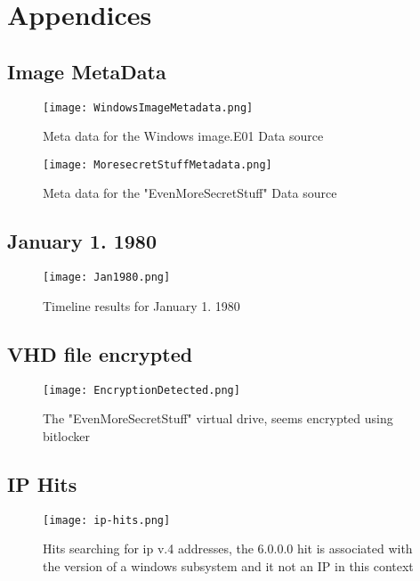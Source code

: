 \documentclass[
	letterpaper, %
	10pt, %
	unnumberedsections, %
	twoside, %
]{APAAssignment}
\begin{document}
\chapter{Appendices}
\begin{appendices}

	\section{Image MetaData}\label{app:MetaData}


	\begin{figure}[!h] %
		\centering
		\texttt{[image: WindowsImageMetadata.png]}
		\caption{Meta data for the Windows image.E01 Data source}
		\label{fig:windowsIageMetadata}
	\end{figure}


	\begin{figure}[!h] %
		\centering
		\texttt{[image: MoresecretStuffMetadata.png]}
		\caption{Meta data for the "EvenMoreSecretStuff" Data source}
		\label{fig:evenMoreSecretStuffMetaData}
	\end{figure}


	\clearpage
	\section{January 1. 1980}\label{app:Jan1980}


	\begin{figure}[!h] %
		\centering
		\texttt{[image: Jan1980.png]}
		\caption{Timeline results for January 1. 1980}
		\label{fig:Jan1980}
	\end{figure}

	\clearpage
	\section{VHD file encrypted}\label{app:SecretDriveEncrypted}

	\begin{figure}[!h] %
		\centering
		\texttt{[image: EncryptionDetected.png]}
		\caption{The "EvenMoreSecretStuff" virtual drive, seems encrypted using bitlocker}
		\label{fig:MoreSecretStuffEncrypted}
	\end{figure}

	\clearpage
	\section{IP Hits}\label{app:IpHits}

	\begin{figure}[!h] %
		\centering
		\texttt{[image: ip-hits.png]}
		\caption{Hits searching for ip v.4 addresses, the 6.0.0.0 hit is associated with the version of a windows subsystem and it not an IP in this context}
		\label{fig:IpHits}
	\end{figure}




\end{appendices}
\end{document}
